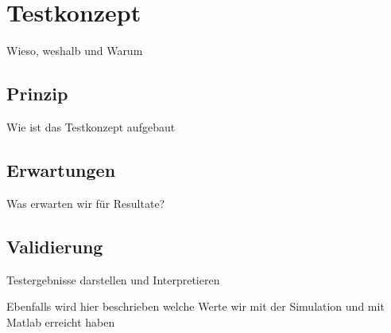 \section{Testkonzept}\label{sec:testkonzept}
Wieso, weshalb und Warum
\subsection{Prinzip} \label{subsec:prinzip}
Wie ist das Testkonzept aufgebaut
\subsection{Erwartungen} \label{subsec:erwartungen}
Was erwarten wir für Resultate?

\subsection{Validierung} \label{subsec:validierung}
Testergebnisse darstellen und Interpretieren

Ebenfalls wird hier beschrieben welche Werte wir mit der Simulation und mit Matlab erreicht haben
